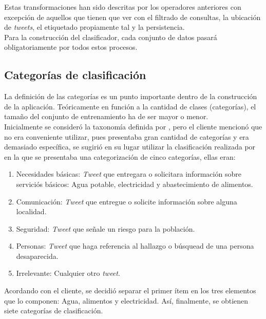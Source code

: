 Estas transformaciones han sido descritas por los operadores anteriores con excepción de aquellos que tienen que ver con el filtrado de consultas, la ubicación de \textit{tweets}, el etiquetado propiamente tal y la persistencia.\\

Para la construcción del clasificador, cada conjunto de datos pasará obligatoriamente por todos estos procesos.\\

\subsection{Categorías de clasificación}
\label{subsec:categorias}

La definición de las categorías es un punto importante dentro de la construcción de la aplicación. Teóricamente en función a la cantidad de clases (categorías), el tamaño del conjunto de entrenamiento ha de ser mayor o menor.\\

Inicialmente se consideró la taxonomía definida por \cite{TaxonomiaChato}, pero el cliente mencionó que no era conveniente utilizar, pues presentaba gran cantidad de categorías y era demasiado específica, se sugirió en su lugar utilizar la clasificación realizada por \cite{Alvarado} en la que se presentaba una categorización de cinco categorías, ellas eran:

\begin{enumerate}
\item Necesidades básicas: \textit{Tweet} que entregara o solicitara información sobre serviciós básicos: Agua potable, electricidad y abastecimiento de alimentos.
\item Comunicación: \textit{Tweet} que entregue o solicite información sobre alguna localidad.
\item Seguridad: \textit{Tweet} que señale un riesgo para la población.
\item Personas: \textit{Tweet} que haga referencia al hallazgo o búsquead de una persona desaparecida.
\item Irrelevante: Cualquier otro \textit{tweet}.
\end{enumerate}

Acordando con el cliente, se decidió separar el primer ítem en los tres elementos que lo componen: Agua, alimentos y electricidad. Así, finalmente, se obtienen siete categorías de clasificación.\\

